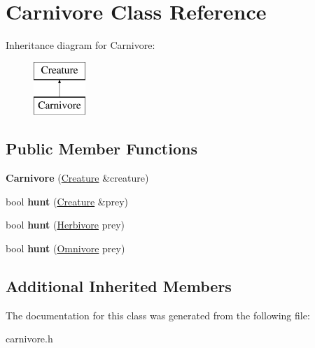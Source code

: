 \hypertarget{class_carnivore}{}\section{Carnivore Class Reference}
\label{class_carnivore}
Inheritance diagram for Carnivore\+:\begin{figure}[H]
\begin{center}
\leavevmode
\includegraphics[height=2.000000cm]{class_carnivore}
\end{center}
\end{figure}
\subsection*{Public Member Functions}
\begin{DoxyCompactItemize}
\item 
\mbox{\label{class_carnivore_a7ff306fd25d0d26f5e785f80aef202c1}} 
{\bfseries Carnivore} (\hyperlink{class_creature}{Creature} \&creature)
\item 
\mbox{\label{class_carnivore_a2ccf871fe78fdf6537e4bbcdbfde8cca}} 
bool {\bfseries hunt} (\hyperlink{class_creature}{Creature} \&prey)
\item 
\mbox{\label{class_carnivore_a17780e68caf7a472474a68948be97f9d}} 
bool {\bfseries hunt} (\hyperlink{class_herbivore}{Herbivore} prey)
\item 
\mbox{\label{class_carnivore_a847b767e22daf1d27b453c12ae504c26}} 
bool {\bfseries hunt} (\hyperlink{class_omnivore}{Omnivore} prey)
\end{DoxyCompactItemize}
\subsection*{Additional Inherited Members}


The documentation for this class was generated from the following file\+:\begin{DoxyCompactItemize}
\item 
carnivore.\+h\end{DoxyCompactItemize}
